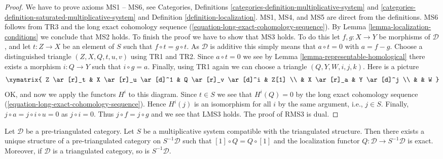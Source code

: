 \begin{proof}
We have to prove axioms MS1 -- MS6, see
Categories, Definitions \ref{categories-definition-multiplicative-system} and
\ref{categories-definition-saturated-multiplicative-system}
and
Definition \ref{definition-localization}.
MS1, MS4, and MS5 are direct from the definitions.
MS6 follows from TR3 and the long exact cohomology sequence
(\ref{equation-long-exact-cohomology-sequence}).
By
Lemma \ref{lemma-localization-conditions}
we conclude that MS2 holds. To finish the proof we have to show that
MS3 holds. To do this let $f, g : X \to Y$ be morphisms of $\mathcal{D}$,
and let $t : Z \to X$ be an element of $S$ such that $f \circ t = g \circ t$.
As $\mathcal{D}$ is additive this simply means that $a \circ t = 0$ with
$a = f - g$. Choose a distinguished triangle $(Z, X, Q, t, u, v)$ using
TR1 and TR2. Since $a \circ t = 0$ we see by
Lemma \ref{lemma-representable-homological}
there exists a morphism $i : Q \to Y$ such that $i \circ g = a$.
Finally, using TR1 again we can choose a triangle
$(Q, Y, W, i, j, k)$. Here is a picture
$$
\xymatrix{
Z \ar[r]_t & X \ar[r]_u \ar[d]^1 & Q \ar[r]_v \ar[d]^i & Z[1] \\
& X \ar[r]_a & Y \ar[d]^j \\
& & W
}
$$
OK, and now we apply the functors $H^i$ to this diagram.
Since $t \in S$ we see that $H^i(Q) = 0$ by the long exact cohomology
sequence (\ref{equation-long-exact-cohomology-sequence}).
Hence $H^i(j)$ is an isomorphism for all $i$ by the same argument,
i.e., $j \in S$. Finally, $j \circ a = j \circ i \circ u = 0$ as
$j \circ i = 0$. Thus $j \circ f = j \circ g$ and we see that LMS3 holds.
The proof of RMS3 is dual.
\end{proof}

\begin{proposition}
\label{proposition-construct-localization}
Let $\mathcal{D}$ be a pre-triangulated category. Let $S$ be a multiplicative
system compatible with the triangulated structure.
Then there exists a unique structure of a pre-triangulated category on
$S^{-1}\mathcal{D}$ such that $[1] \circ Q = Q \circ [1]$ and
the localization functor $Q : \mathcal{D} \to S^{-1}\mathcal{D}$ is exact.
Moreover, if $\mathcal{D}$ is a triangulated category, so is
$S^{-1}\mathcal{D}$.
\end{proposition}

